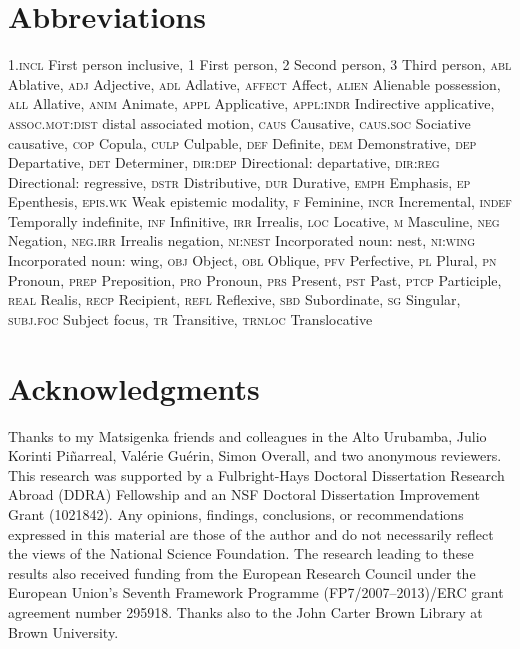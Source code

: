 \documentclass[output=paper]{LSP/langsci}
\begin{document}
\section*{ Abbreviations}
\textsc{1.incl}   First person inclusive,
1      First person,
2      Second person,
3      Third person,
\textsc{abl}      Ablative,
\textsc{adj}      Adjective,
\textsc{adl}      Adlative,
\textsc{affect}      Affect,
\textsc{alien}      Alienable possession,
\textsc{all}      Allative,
\textsc{anim}      Animate,
\textsc{appl}      Applicative,
\textsc{appl:indr}    Indirective applicative,
\textsc{assoc.mot:dist}  distal associated motion,
\textsc{caus}      Causative,
\textsc{caus.soc}    Sociative causative,
\textsc{cop}      Copula,
\textsc{culp}      Culpable,
\textsc{def}      Definite,
\textsc{dem}      Demonstrative,
\textsc{dep}      Departative,
\textsc{det}      Determiner,
\textsc{dir:dep}    Directional: departative,
\textsc{dir:reg}    Directional: regressive,
\textsc{dstr}      Distributive,
\textsc{dur}      Durative,
\textsc{emph}      Emphasis,
\textsc{ep}      Epenthesis,
\textsc{epis.wk}    Weak epistemic modality,
\textsc{f}      Feminine,
\textsc{incr}      Incremental,
\textsc{indef}      Temporally indefinite,
\textsc{inf}      Infinitive,
\textsc{irr}      Irrealis,
\textsc{loc}      Locative,
\textsc{m}      Masculine,
\textsc{neg}      Negation,
\textsc{neg.irr} Irrealis negation,
\textsc{ni:nest}   Incorporated noun: nest,
\textsc{ni:wing}    Incorporated noun: wing,
\textsc{obj}      Object,
\textsc{obl}      Oblique,
\textsc{pfv}      Perfective,
\textsc{pl}      Plural,
\textsc{pn}      Pronoun,
\textsc{prep}      Preposition,
\textsc{pro}      Pronoun,
\textsc{prs}      Present,
\textsc{pst}      Past,
\textsc{ptcp}      Participle,
\textsc{real}      Realis,
\textsc{recp}      Recipient,
\textsc{refl}      Reflexive,
\textsc{sbd}      Subordinate,
\textsc{sg}      Singular,
\textsc{subj.foc}    Subject focus,
\textsc{tr}      Transitive,
\textsc{trnloc}     Translocative

\section*{ Acknowledgments}
Thanks to my Matsigenka friends and colleagues in the Alto Urubamba, Julio Korinti Piñarreal, Valérie Guérin, Simon Overall, and two anonymous reviewers. This research was supported by a Fulbright-Hays Doctoral Dissertation Research Abroad (DDRA) Fellowship and an NSF Doctoral Dissertation Improvement Grant (1021842). Any opinions, findings, conclusions, or recommendations expressed in this material are those of the author and do not necessarily reflect the views of the National Science Foundation. The research leading to these results also received funding from the European Research Council under the European Union’s Seventh Framework Programme (FP7/2007–2013)/ERC grant agreement number 295918. Thanks also to the John Carter Brown Library at Brown University.
%


\printbibliography[heading=subbibliography,notkeyword=this] 
\end{document}

